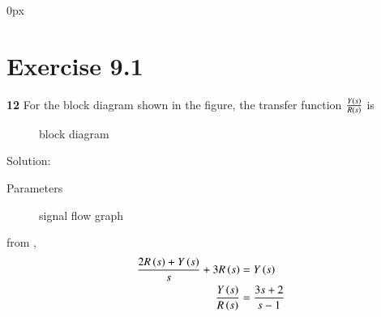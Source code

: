 \documentclass[journal,12pt,twocolumn]{IEEEtran}
\theoremstyle{remark}
\begin{document}
\parindent 0px


\vspace{3cm}

\title{}
\author{EE23BTECH11217 - Prajwal M$^{*}$
}
\maketitle
\newpage
\bigskip



\section*{Exercise 9.1}

\noindent \textbf{12} \hspace{2pt}For the block diagram shown in the figure, the transfer function $\frac{Y\left(s\right)}{R\left(s\right)}$ is \\
\begin{figure}[h]
    \centering
    
    \caption{block diagram}
    \label{fig:9.1.12.1}
\end{figure}

Solution:\\
\begin{table}[h]
    \centering
    
    \caption{Parameters}
    \label{tab:9.1.12.1}
\end{table}

\begin{figure}[h]
    \centering
    
    \caption{signal flow graph}
    \label{fig: 9.1.12.2}
\end{figure}

from ,
\begin{align}
    \frac{2R\left(s\right) + Y\left(s\right)}{s} + 3R\left(s\right) & = Y\left(s\right)\\
    \frac{Y\left(s\right)}{R\left(s\right)} & = \frac{3s+2}{s-1}
\end{align}
\end{document}
